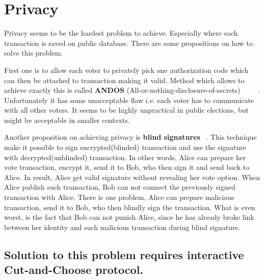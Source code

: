 \documentclass[runningheads]{llncs}
\begin{document}
\section{Privacy}
\label{privacy}
Privacy seems to be the hardest problem to achieve. Especially where each transaction is saved on public database. There are some propositions on how to solve this problem. 

First one is to allow each voter to privately pick one authorization code which can then be attached to transaction making it valid. Method which allows to achieve exactly this is called \textbf{ANDOS} (All-or-nothing-disclosure-of-secrets) ~\cite{andos} ~\cite{salomaa1990secret} ~\cite{applied_cryptography}. Unfortunately it has some unacceptable flaw i.e. each voter has to communicate with all other voters. It seems to be highly unpractical in public elections, but might be acceptable in smaller contexts. 

Another proposition on achieving privacy is \textbf{blind signatures} ~\cite{applied_cryptography}. This technique make it possible to sign encrypted(blinded) transaction and use the signature with decrypted(unblinded) transaction. In other words, Alice can prepare her vote transaction, encrypt it, send it to Bob, who then sign it and send back to Alice. In result, Alice get valid signature without revealing her vote option. When Alice publish such transaction, Bob can not connect the previously signed transaction with Alice. 
There is one problem, Alice can prepare malicious transaction, send it to Bob, who then blindly sign the transaction. What is even worst, is the fact that Bob can not punish Alice, since he has already broke link between her identity and such malicious transaction during blind signature.

\subsection{Solution to this problem requires interactive Cut-and-Choose protocol.}
\label{cut-and-choose}
\end{document}
